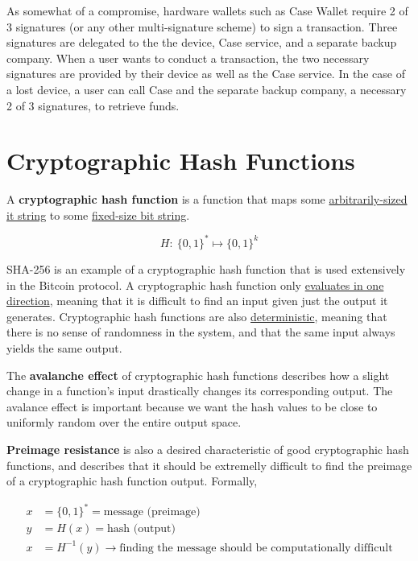 \documentclass[11pt]{article}
\begin{document}
   As somewhat of a compromise, hardware wallets such as Case Wallet require 2 of 3 signatures (or any other multi-signature scheme) to sign a transaction. Three signatures are delegated to the the device, Case service, and a separate backup company. When a user wants to conduct a transaction, the two necessary signatures are provided by their device as well as the Case service. In the case of a lost device, a user can call Case and the separate backup company, a necessary 2 of 3 signatures, to retrieve funds.
   
   
   
   \section*{Cryptographic Hash Functions}
   
   A \textbf{cryptographic hash function} is a function that maps some \underline{arbitrarily-sized it string} to some \underline{fixed-size bit string}. 
   
   $$H:~ \{0,1\}^{*} \mapsto \{0,1\}^{k}$$
   
   SHA-256 is an example of a cryptographic hash function that is used extensively in the Bitcoin protocol. A cryptographic hash function only \underline{evaluates in one direction}, meaning that it is difficult to find an input given just the output it generates. Cryptographic hash functions are also \underline{deterministic}, meaning that there is no sense of randomness in the system, and that the same input always yields the same output. 
   
   The \textbf{avalanche effect} of cryptographic hash functions describes how a slight change in a function's input drastically changes its corresponding output. The avalance effect is important because we want the hash values to be close to uniformly random over the entire output space.
   
   \textbf{Preimage resistance} is also a desired characteristic of good cryptographic hash functions, and describes that it should be extremelly difficult to find the preimage of a cryptographic hash function output. Formally,
   
   \begin{align*}
       x &= \{0,1\}^{*} = \text{message (preimage)} \\
       y &= H(x) = \text{hash (output)} \\
       x &= H^{-1}(y) \rightarrow \text{finding the message should be computationally difficult}
   \end{align*}
   
\end{document}
